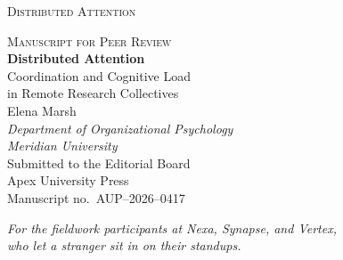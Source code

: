 
\pagestyle{empty}

\begin{center}
  \vspace*{2.2in}
  {\Large\scshape\color{slategray} Distributed Attention}
\end{center}

\clearpage

\begin{titlepage}
  \centering
  \vspace*{0.8in}
  {\fontsize{11pt}{13pt}\selectfont\textcolor{claret}{\scshape Manuscript for Peer Review}}\\[1.4in]
  {\Huge\bfseries\color{inkblue} Distributed Attention}\\[0.3in]
  {\Large\color{slategray} Coordination and Cognitive Load\\ in Remote Research Collectives}\\[1.0in]
  {\large Elena Marsh}\\[0.1in]
  {\small\itshape Department of Organizational Psychology\\ Meridian University}\\[1.6in]
  {\small\color{slategray} Submitted to the Editorial Board\\ Apex University Press\\ Manuscript no.\ AUP--2026--0417}
  \vfill
\end{titlepage}

\begin{center}
  \vspace*{2.4in}
  {\itshape For the fieldwork participants at Nexa, Synapse, and Vertex,\\
  who let a stranger sit in on their standups.}
\end{center}

\clearpage

\pagestyle{fancy}
\tableofcontents

\clearpage
